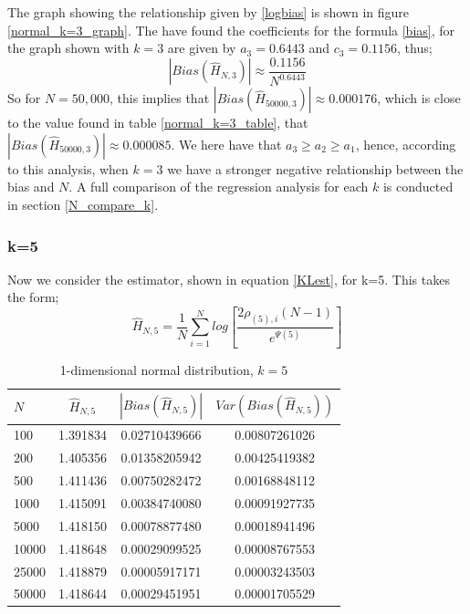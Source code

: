 \documentclass{article}
\begin{document}
The graph showing the relationship given by \ref{logbias} is shown in figure \ref{normal_k=3_graph}. The have found the coefficients for the formula \ref{bias}, for the graph shown with $k=3$ are given by $a_{3} = 0.6443$ and $c_{3} = 0.1156$, thus;
\begin{equation}
|Bias(\hat{H}_{N, 3})| \approx \frac{0.1156}{N^{0.6443}} \nonumber
\end{equation}
So for $N=50,000$, this implies that $|Bias(\hat{H}_{50000, 3})| \approx 0.000176$, which is close to the value found in table \ref{normal_k=3_table}, that $|Bias(\hat{H}_{50000, 3})| \approx 0.000085$. We here have that $a_{3} \geq a_{2} \geq a_{1}$, hence, according to this analysis, when $k=3$ we have a stronger negative relationship between the bias and $N$. A full comparison of the regression analysis for each $k$ is conducted in section \ref{N_compare_k}.




\subsubsection{k=5} \label{N_k=5}
Now we consider the estimator, shown in equation \ref{KLest}, for k=5. This takes the form;
\begin{equation}
\hat{H}_{N, 5} = \frac{1}{N} \sum_{i=1}^{N} log \left[ \frac{2\rho_{(5),i}(N-1)}{e^{\Psi(5)}} \right] \nonumber
\end{equation}

\begin{table}
\caption{1-dimensional normal distribution, $k=5$} \label{normal_k=5_table}
\begin{center}
\begin{tabular}{| l | c c c|} 
\toprule
$N$ & $\hat{H}_{N, 5}$ & $|Bias(\hat{H}_{N, 5})|$ & $Var(Bias(\hat{H}_{N, 5}))$ \\
\midrule[1pt]
100     & 1.391834     & 0.02710439666     & 0.00807261026  \\
200     & 1.405356     & 0.01358205942     & 0.00425419382  \\
500     & 1.411436     & 0.00750282472     & 0.00168848112  \\
1000    & 1.415091     & 0.00384740080     & 0.00091927735  \\
5000    & 1.418150     & 0.00078877480     & 0.00018941496  \\
10000   & 1.418648     & 0.00029099525     & 0.00008767553  \\
25000   & 1.418879     & 0.00005917171     & 0.00003243503  \\
50000   & 1.418644     & 0.00029451951     & 0.00001705529  \\
\hline
\end{tabular}
\end{center}
\end{table}
\end{document}
